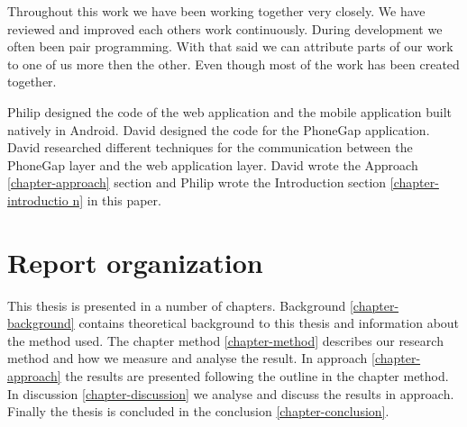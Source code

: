 Throughout this work we have been working together very closely. We have reviewed and improved each others work continuously. During development we often been pair programming. With that said we can attribute parts of our work to one of us more then the other. Even though most of the work has been created together. 

Philip designed the code of the web application and the mobile application built natively in Android. David designed the code for the PhoneGap application. David researched different techniques for the communication between the PhoneGap layer and the web application layer. David wrote the Approach \ref{chapter-approach} section and Philip wrote the Introduction section \ref{chapter-introductio
n} in this paper. 

\section{Report organization}\label{section-report-organization}
This thesis is presented in a number of chapters. Background \ref{chapter-background} contains theoretical background to this thesis and information about the method used. The chapter method \ref{chapter-method} describes our research method and how we measure and analyse the result. In approach \ref{chapter-approach} the results are presented following the outline in the chapter method. In discussion \ref{chapter-discussion} we analyse and discuss the results in approach. Finally the thesis is concluded in the conclusion \ref{chapter-conclusion}.